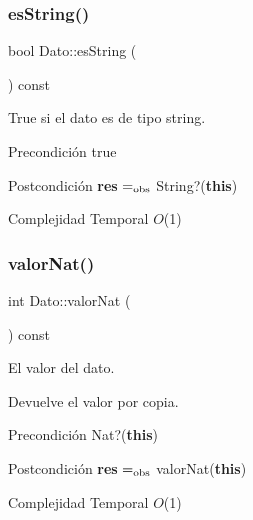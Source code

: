 \subsubsection{\texorpdfstring{es\+String()}{esString()}}
{\footnotesize\ttfamily bool Dato\+::es\+String (\begin{DoxyParamCaption}{ }\end{DoxyParamCaption}) const}



True si el dato es de tipo string. 

\begin{DoxyPrecond}{Precondición}
true 
\end{DoxyPrecond}
\begin{DoxyPostcond}{Postcondición}
{\bfseries res} $=_{\rm obs}$ String?({\bfseries this}) 
\begin{DoxyDescription}
\item[Complejidad Temporal]$O$(1)
\end{DoxyDescription}
\end{DoxyPostcond}
\mbox{\label{classDato_a77c0d9e6acfa7b69d3a7afbe6c24066b}} 
\subsubsection{\texorpdfstring{valor\+Nat()}{valorNat()}}
{\footnotesize\ttfamily int Dato\+::valor\+Nat (\begin{DoxyParamCaption}{ }\end{DoxyParamCaption}) const}



El valor del dato. 

Devuelve el valor por copia.

\begin{DoxyPrecond}{Precondición}
Nat?({\bfseries this}) 
\end{DoxyPrecond}
\begin{DoxyPostcond}{Postcondición}
{\bfseries res} $=_{\rm obs}$ valor\+Nat({\bfseries this}) 
\begin{DoxyDescription}
\item[Complejidad Temporal]$O$(1)
\end{DoxyDescription}
\end{DoxyPostcond}
\mbox{\label{classDato_aeba738995483557ab6bdd9b677f6da63}} 
